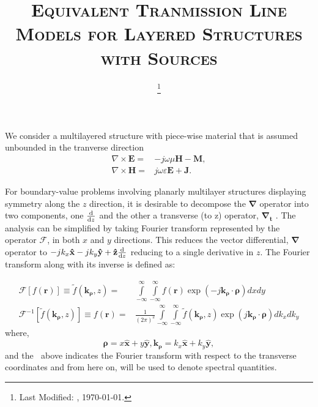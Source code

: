 \documentclass[11pt]{article}
\renewcommand{\v}[1]{\mathbf{#1}} %
\newcommand{\ti}[1]{\tilde{#1}} %
\renewcommand{\O}{\omega}  %
\newcommand{\E}{\varepsilon}  %
\renewcommand{\u}{\mu}  %
\newcommand{\p}{\rho}  %
\newcommand{\x}{\times}  %
\renewcommand{\inf}{\infty}  %
\newcommand{\infint}{\int\limits_{-\inf}^\inf} %
\newcommand{\del}{\nabla}  %
\renewcommand{\^}{\hat}  %
\begin{document}
  \title{\textsc{Equivalent Tranmission Line Models for Layered Structures with Sources}\\}
  \date{\footnote{Last Modified: \currenttime, \today.}}
  \maketitle
  We consider a multilayered structure with piece-wise material that is assumed unbounded in the tranverse direction
  \begin{subequations}
    \begin{align}
      \del\x{\v E} ={}& -j \O \u \v{H} -\v{M},
      \label{eq:E}\\
      \del\x{\v H} ={}& j \O \E \v{E} + \v{J}.
      \label{eq:H}
    \end{align}
    \label{eq:MaxE}
  \end{subequations}

  For boundary-value problems involving planarly multilayer structures displaying symmetry along the $z$ direction, it is desirable to decompose the $\v{\del}$ operator into two components, one $\dv{}{z}$ and the other a transverse (to z) operator, $\v{\del_t}$ \cite[p. 64]{felsen1994radiation}. The analysis can be simplified by taking Fourier transform represented by the operator $\mathcal{F}$, in both $x$ and $y$ directions. This reduces the vector differential, $\v{\del}$ operator to $-j k_x \v{\^{x}} - j k_y \v{\^{y}} + \v{\^{z}}\dv{}{z}$
  reducing to a single derivative in $z$.
  The Fourier transform along with its inverse is defined as:

  \begin{subequations}
    \begin{align}
      \mathcal{F}[f(\v{r})] \equiv \ti{f}(\v{k_{\p}},z) ={}& \infint \infint
      f(\v{r}) \exp(-j \v{k_{\p}} \cdot \v{\p}) dx dy
      \label{eq:Fourier}\\
      \mathcal{F}^{-1}[\ti{f}(\v{k_{\p}},z)] \equiv f(\v{r}) ={}& \frac{1}{(2\pi)^2} \infint \infint \ti{f}(\v{k_{\p}},z)
      \exp(j \v{k_{\p}} \cdot \v{\p}) dk_x dk_y
      \label{eq:IFourier}
    \end{align}
    \label{eq:FT}
  \end{subequations}
  where,
  \begin{equation}
    \v{\p} = x\v{\^{x}} + y\v{\^{y}},
    \v{k_{\p}} = k_x\v{\^{x}} + k_y\v{\^{y}},
  \end{equation}
  and the $~$ above indicates the Fourier transform with respect to the transverse coordinates and from here on, will be used to denote spectral quantities.
\end{document}
